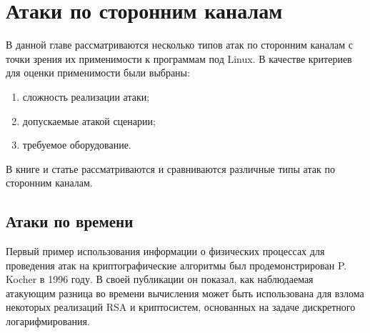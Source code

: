 \section{Атаки по сторонним каналам} \label{sec:sca}

В данной главе рассматриваются несколько типов атак по сторонним каналам с
точки зрения их применимости к программам под Linux. В качестве критериев для
оценки применимости были выбраны:

\begin{enumerate}
\item сложность реализации атаки;
\item допускаемые атакой сценарии;
\item требуемое оборудование.
\end{enumerate}

В книге \cite{cren} и статье \cite{10years}
рассматриваются и сравниваются различные типы атак по сторонним каналам.



\subsection{Атаки по времени}

Первый пример использования информации о физических процессах для проведения
атак на криптографические алгоритмы был продемонстрирован P. Kocher в 1996 году.
В своей публикации \cite{kocher} он показал, как наблюдаемая атакующим разница
во времени вычисления может быть использована для взлома некоторых реализаций
RSA и криптосистем, основанных на задаче дискретного логарифмирования.

